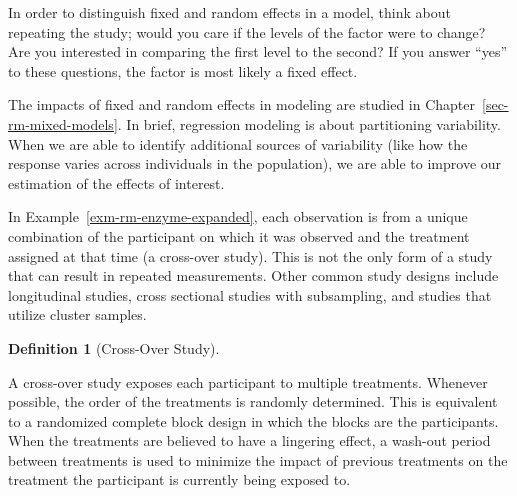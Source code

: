 \documentclass[
  letterpaper,
  DIV=11,
  numbers=noendperiod]{scrreprt}
\theoremstyle{definition}
\theoremstyle{definition}
\newtheorem{definition}{Definition}[chapter]
\theoremstyle{remark}
\begin{document}
\begin{tcolorbox}[enhanced jigsaw, bottomrule=.15mm, titlerule=0mm, bottomtitle=1mm, colback=white, coltitle=black, rightrule=.15mm, leftrule=.75mm, toprule=.15mm, toptitle=1mm, left=2mm, opacityback=0, colframe=quarto-callout-note-color-frame, breakable, title=\textcolor{quarto-callout-note-color}{\faInfo}\hspace{0.5em}{Note}, arc=.35mm, colbacktitle=quarto-callout-note-color!10!white, opacitybacktitle=0.6]

In order to distinguish fixed and random effects in a model, think about
repeating the study; would you care if the levels of the factor were to
change? Are you interested in comparing the first level to the second?
If you answer ``yes'' to these questions, the factor is most likely a
fixed effect.

\end{tcolorbox}

The impacts of fixed and random effects in modeling are studied in
Chapter~\ref{sec-rm-mixed-models}. In brief, regression modeling is
about partitioning variability. When we are able to identify additional
sources of variability (like how the response varies across individuals
in the population), we are able to improve our estimation of the effects
of interest.

In Example~\ref{exm-rm-enzyme-expanded}, each observation is from a
unique combination of the participant on which it was observed and the
treatment assigned at that time (a cross-over study). This is not the
only form of a study that can result in repeated measurements. Other
common study designs include longitudinal studies, cross sectional
studies with subsampling, and studies that utilize cluster samples.

\begin{definition}[Cross-Over
Study]\protect\hypertarget{def-cross-over-study}{}\label{def-cross-over-study}

A cross-over study exposes each participant to multiple treatments.
Whenever possible, the order of the treatments is randomly determined.
This is equivalent to a randomized complete block design in which the
blocks are the participants. When the treatments are believed to have a
lingering effect, a wash-out period between treatments is used to
minimize the impact of previous treatments on the treatment the
participant is currently being exposed to.

\end{definition}
\end{document}
